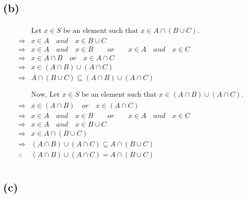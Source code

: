 \documentclass[]{article}
\begin{document}
\subsection* {(b)}

\begin{align*}
	\begin{split}
		&\text{Let $x \in S$ be an element such that $x \in A\cap (B \cup C)$.}\\
		\Rightarrow& x \in A \quad and \quad x \in B \cup C\\
		\Rightarrow& x \in A \quad and \quad x \in B \qquad or \qquad x \in A \quad and \quad x \in C\\ 
		\Rightarrow& x \in A \cap B \quad or \quad x \in A \cap C\\
		\Rightarrow& x \in (A \cap B) \cup (A \cap C)\\
		\Rightarrow&  A\cap(B \cup C) \subseteq (A \cap B) \cup (A \cap C)\\
	\end{split}\\
	\begin{split}
		&\text{Now, Let $x \in S$ be an element such that $x \in (A \cap B) \cup (A \cap C)$.}\\
		\Rightarrow& x \in (A \cap B) \quad or \quad x \in (A \cap C)\\
		\Rightarrow& x \in A \quad and \quad x \in B \qquad or \qquad x \in A \quad and \quad x \in C\\ 
		\Rightarrow& x \in A \quad and \quad x \in B \cup C\\
		\Rightarrow& x \in A \cap (B \cup C)\\
		\Rightarrow& (A \cap B) \cup (A \cap C) \subseteq A\cap(B \cup C)\\
		\therefore& (A \cap B) \cup (A \cap C) = A\cap(B \cup C)
	\end{split}\\
\end{align*}



\subsection* {(c)}
\end{document}
